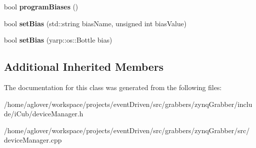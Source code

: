 \begin{DoxyCompactItemize}
\item 
\hypertarget{classvsctrlDevManager_a559222224b7f13e14f0a80ba327bbb27}{bool {\bfseries program\-Biases} ()}\label{classvsctrlDevManager_a559222224b7f13e14f0a80ba327bbb27}

\item 
\hypertarget{classvsctrlDevManager_a086729caaeb04be43699fe5292c44e25}{bool {\bfseries set\-Bias} (std\-::string bias\-Name, unsigned int bias\-Value)}\label{classvsctrlDevManager_a086729caaeb04be43699fe5292c44e25}

\item 
\hypertarget{classvsctrlDevManager_a558be9af52147baee357e9c1a28b2268}{bool {\bfseries set\-Bias} (yarp\-::os\-::\-Bottle bias)}\label{classvsctrlDevManager_a558be9af52147baee357e9c1a28b2268}

\end{DoxyCompactItemize}
\subsection*{Additional Inherited Members}


The documentation for this class was generated from the following files\-:\begin{DoxyCompactItemize}
\item 
/home/aglover/workspace/projects/event\-Driven/src/grabbers/zynq\-Grabber/include/i\-Cub/device\-Manager.\-h\item 
/home/aglover/workspace/projects/event\-Driven/src/grabbers/zynq\-Grabber/src/device\-Manager.\-cpp\end{DoxyCompactItemize}
